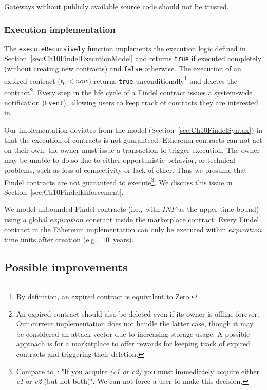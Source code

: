 Gateways without publicly available source code should not be trusted.


\subsubsection{Execution implementation} \label{sec:Ch10FindelExecutionImplementation}

The \texttt{executeRecursively} function implements the execution logic defined in Section~\ref{sec:Ch10FindelExecutionModel} and returns \texttt{true} if executed completely (without creating new contracts) and \texttt{false} otherwise.
The execution of an expired contract ($t_0 < now$) returns \texttt{true} unconditionally\footnote{By definition, an expired contract is equivalent to \(\mathrm{Zero}\).} and deletes the contract\footnote{An expired contract should also be deleted even if its owner is offline forever. Our current implementation does not handle the latter case, though it may be considered an attack vector due to increasing storage usage. A possible approach is for a marketplace to offer rewards for keeping track of expired contracts and triggering their deletion.}.
Every step in the life cycle of a Findel contract issues a system-wide notification (\texttt{Event}), allowing users to keep track of contracts they are interested in.

Our implementation deviates from the model (Section~\ref{sec:Ch10FindelSyntax}) in that the execution of contracts is not guaranteed.
Ethereum contracts can not act on their own: the owner must issue a transaction to trigger execution.
The owner may be unable to do so due to either opportunistic behavior, or technical problems, such as loss of connectivity or lack of ether.
Thus we presume that Findel contracts are not guaranteed to execute\footnote{Compare to~\cite{PeytonJones2000}: "If you acquire \textit{(c1 or c2)} you must immediately acquire either \textit{c1} or \textit{c2} (but not both)". We can not force a user to make this decision.}.
We discuss this issue in Section~\ref{sec:Ch10FindelEnforcement}.

We model unbounded Findel contracts (i.e.,~with $INF$ as the upper time bound) using a global $expiration$ constant inside the marketplace contract.
Every Findel contract in the Ethereum implementation can only be executed within $expiration$ time units after creation (e.g.,~10~years).


\subsection{Possible improvements}

